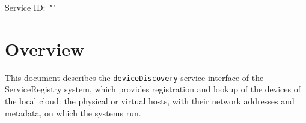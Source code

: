 \documentclass[a4paper]{arrowhead}
\begin{document}
\sloppy

\ArrowheadSetup

\begin{center}
  \vspace*{1cm}
  \huge{\arrowtitle}

  \vspace*{0.2cm}
  \LARGE{\arrowtype}
  \vspace*{1cm}

  \Large{Service ID: \textit{"\arrowid"}}

  \vspace*{\fill}


  \vspace*{1cm}
  \vspace*{\fill}

  \begin{abstract}
    This document describes the HTTP/1.1 protocol with TLS payload security and JSON payload encoding variant of the \texttt{deviceDiscovery} service of the ServiceRegistry system.
  \end{abstract}

  \vspace*{1cm}
\end{center}

\newpage

\tableofcontents
\newpage

\section{Overview}
\label{sec:overview}

This document describes the \texttt{deviceDiscovery} service interface of the ServiceRegistry system, which provides registration and lookup of the devices of the local cloud: the physical or virtual hosts, with their network addresses and metadata, on which the systems run.
\end{document}
